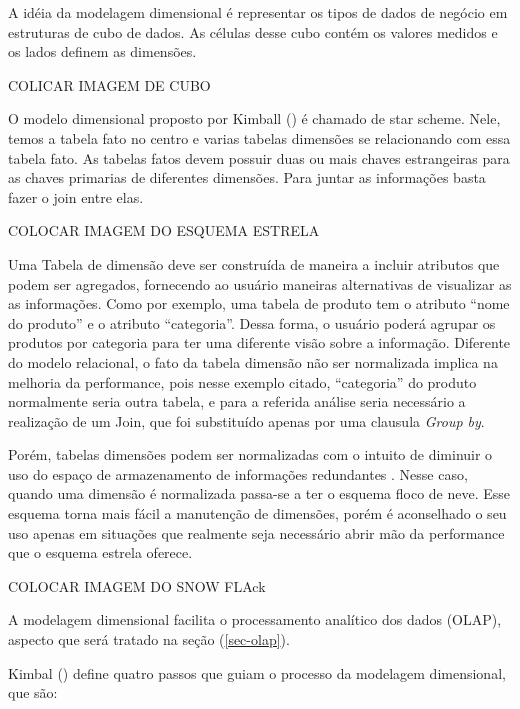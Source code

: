 %

A idéia da modelagem dimensional é representar os tipos de dados de negócio em estruturas de cubo de dados. As células desse cubo contém os valores medidos e os lados definem as dimensões.

COLICAR IMAGEM DE CUBO

%

O modelo dimensional proposto por Kimball (\citeyear{kimball2002}) é chamado de star scheme. Nele, temos a tabela fato no centro e varias tabelas dimensões se relacionando com essa tabela fato. As tabelas fatos devem possuir duas ou mais chaves estrangeiras para as chaves primarias de diferentes dimensões. Para juntar as informações basta fazer o join entre elas.

COLOCAR IMAGEM DO ESQUEMA ESTRELA

%

Uma Tabela de dimensão deve ser construída de maneira a incluir atributos que podem ser agregados, fornecendo ao usuário maneiras alternativas de visualizar as as informações. Como por exemplo, uma tabela de produto tem o atributo “nome do produto” e o atributo “categoria”. Dessa forma, o usuário poderá agrupar os produtos por categoria para ter uma diferente visão sobre a informação. Diferente do modelo relacional, o fato da tabela dimensão não ser normalizada implica na melhoria da performance, pois nesse exemplo citado, “categoria” do produto normalmente seria outra tabela, e para a referida análise seria necessário a realização de um Join, que foi substituído apenas por uma clausula \emph{Group by}.

%

Porém, tabelas dimensões podem ser normalizadas com o intuito de diminuir o uso do espaço de armazenamento de informações redundantes \cite{kimball2002}. Nesse caso, quando uma dimensão é normalizada passa-se a ter o esquema floco de neve. Esse esquema torna mais fácil a manutenção de dimensões, porém é aconselhado o seu uso apenas em situações que realmente seja necessário abrir mão da performance que o esquema estrela oferece.

COLOCAR IMAGEM DO SNOW FLAck

%

A modelagem dimensional facilita o processamento analítico dos dados (OLAP), aspecto que será tratado na seção (\ref{sec-olap}).

%

 Kimbal (\citeyear{kimball2002}) define quatro passos que guiam o processo da modelagem dimensional, que são:

